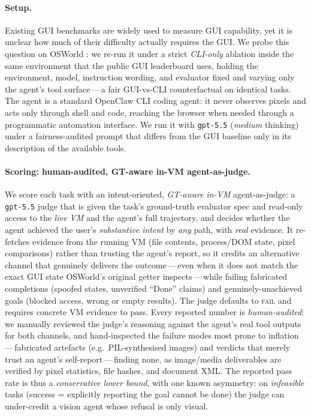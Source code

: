 \documentclass{llmxive}
\providecommand{\section}[1]{  \oldappendixsection{#1}  \setcounter{table}{0}  \setcounter{figure}{0}}
\begin{document}
\FloatBarrier
\section{CLI-Only Re-evaluation of OSWorld}
\label{app:cli-osworld}

\paragraph{Setup.}
Existing GUI benchmarks are widely used to measure GUI capability, yet it is
unclear how much of their difficulty actually requires the GUI. We probe this
question on OSWorld \citep{xie2024osworld}: we re-run it under a strict
\emph{CLI-only} ablation inside the same environment that the public GUI
leaderboard uses, holding the environment, model, instruction wording, and
evaluator fixed and varying only the agent's tool surface\,---\,a fair
GUI-vs-CLI counterfactual on identical tasks. The agent is a standard
OpenClaw CLI coding agent: it never observes pixels and acts only through
shell and code, reaching the browser when needed through a programmatic
automation interface. We run it with \texttt{gpt-5.5} (\emph{medium}
thinking) under a fairness-audited prompt that differs from the GUI baseline
only in its description of the available tools.

\paragraph{Scoring: human-audited, GT-aware in-VM agent-as-judge.}
We score each task with an intent-oriented, \emph{GT-aware} \emph{in-VM}
agent-as-judge: a \texttt{gpt-5.5} judge that is given the task's ground-truth
evaluator spec and read-only access to the \emph{live VM} and the agent's full
trajectory, and decides whether the agent achieved the user's
\emph{substantive intent} by \emph{any} path, with \emph{real} evidence. It
re-fetches evidence from the running VM (file contents, process/DOM state,
pixel comparisons) rather than trusting the agent's report, so it credits an
alternative channel that genuinely delivers the outcome\,---\,even when it does
not match the exact GUI state OSWorld's original getter inspects\,---\,while
failing fabricated completions (spoofed states, unverified ``Done'' claims) and
genuinely-unachieved goals (blocked access, wrong or empty results). The judge
defaults to \textsc{fail} and requires concrete VM evidence to pass. Every
reported number is \emph{human-audited}: we manually reviewed the judge's
reasoning against the agent's real tool outputs for both channels, and
hand-inspected the failure modes most prone to inflation\,---\,fabricated
artefacts (e.g.\ PIL-synthesised images) and verdicts that merely trust an
agent's self-report\,---\,finding none, as image/media deliverables are verified
by pixel statistics, file hashes, and document XML. The reported pass rate is
thus a \emph{conservative lower bound}, with one known asymmetry: on
\emph{infeasible} tasks (success = explicitly reporting the goal cannot be done)
the judge can under-credit a vision agent whose refusal is only visual.
\end{document}
